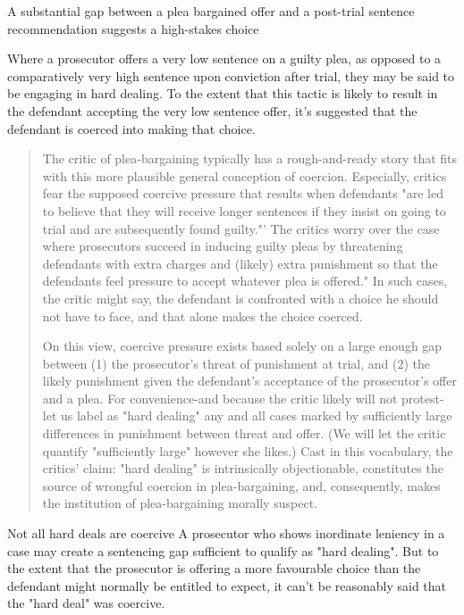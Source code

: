 A substantial gap between a plea bargained offer and a post-trial sentence recommendation suggests a high-stakes choice

Where a prosecutor offers a very low sentence on a guilty plea, as opposed to a comparatively very high sentence upon conviction after trial, they may be said to be engaging in hard dealing. To the extent that this tactic is likely to result in the defendant accepting the very low sentence offer, it's suggested that the defendant is coerced into making that choice.

\begin{quote}
    The critic of plea-bargaining typically has a rough-and-ready story that fits with this more plausible general conception of coercion. Especially, critics fear the supposed coercive pressure that results when defendants "are led to believe that they will receive longer sentences if they insist on going to trial and are subsequently found guilty."' The critics worry over the case where prosecutors succeed in inducing guilty pleas by threatening defendants with extra charges and (likely) extra punishment so that the defendants feel pressure to accept whatever plea is offered." In such cases, the critic might say, the defendant is confronted with a choice he should not have to face, and that alone makes the choice coerced.
    
    On this view, coercive pressure exists based solely on a large enough gap between (1) the prosecutor's threat of punishment at trial, and (2) the likely punishment given the defendant's acceptance of the prosecutor's offer and a plea. For convenience-and because the critic likely will not protest-let us label as "hard dealing" any and all cases marked by sufficiently large differences in punishment between threat and offer. (We will let the critic quantify "sufficiently large" however she likes.) Cast in this vocabulary, the critics' claim: "hard dealing" is intrinsically objectionable, constitutes the source of wrongful coercion in plea-bargaining, and, consequently, makes the institution of plea-bargaining morally suspect.
\end{quote}

Not all hard deals are coercive
A prosecutor who shows inordinate leniency in a case may create a sentencing gap sufficient to qualify as "hard dealing". But to the extent that the prosecutor is offering a more favourable choice than the defendant might normally be entitled to expect, it can't be reasonably said that the "hard deal" was coercive.

